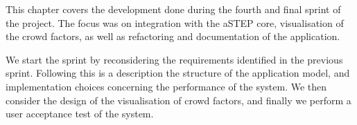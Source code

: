 This chapter covers the development done during the fourth and final sprint of the project. The focus was on integration with the aSTEP core, visualisation of the crowd factors, as well as refactoring and documentation of the application.

We start the sprint by reconsidering the requirements identified in the previous sprint. Following this is a description the structure of the application model, and implementation choices concerning the performance of the system. We then consider the design of the visualisation of crowd factors, and finally we perform a user acceptance test of the system.